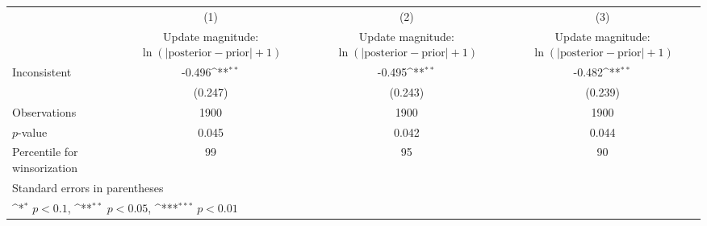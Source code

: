 {
\def\sym#1{\ifmmode^{#1}\else\(^{#1}\)\fi}
\begin{tabular}{l*{3}{c}}
\hline\hline
                    &\multicolumn{1}{c}{(1)}         &\multicolumn{1}{c}{(2)}         &\multicolumn{1}{c}{(3)}         \\
                    &\shortstack{Update magnitude: \\ $ \ln(|\text{posterior}-\text{prior} | + 1) $}         &\shortstack{Update magnitude: \\ $ \ln(|\text{posterior}-\text{prior} | + 1) $}         &\shortstack{Update magnitude: \\ $ \ln(|\text{posterior}-\text{prior} | + 1) $}         \\
\hline
Inconsistent        &      -0.496\sym{**} &      -0.495\sym{**} &      -0.482\sym{**} \\
                    &     (0.247)         &     (0.243)         &     (0.239)         \\
\hline
Observations        &        1900         &        1900         &        1900         \\
$p$-value           &       0.045         &       0.042         &       0.044         \\
Percentile for winsorization&          99         &          95         &          90         \\
\hline\hline
\multicolumn{4}{l}{\footnotesize Standard errors in parentheses}\\
\multicolumn{4}{l}{\footnotesize \sym{*} \(p<0.1\), \sym{**} \(p<0.05\), \sym{***} \(p<0.01\)}\\
\end{tabular}
}
